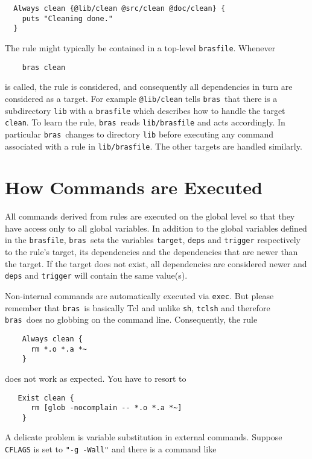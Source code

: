 \documentclass[12pt]{article}
\newcommand{\bras}{\texttt{bras}}
\begin{document}
\begin{verbatim}
  Always clean {@lib/clean @src/clean @doc/clean} {
    puts "Cleaning done."
  }
\end{verbatim}

The rule might typically be contained in a top-level
\texttt{brasfile}. Whenever 
\begin{verbatim}
    bras clean
\end{verbatim}
is called, the rule is considered, and consequently all
dependencies in turn are considered as a target. For example
\texttt{@lib/clean} tells \bras\ that there is a subdirectory
\texttt{lib} with a \texttt{brasfile} which
describes how to handle the target \texttt{clean}. To learn
the rule, \bras\ reads \texttt{lib/brasfile} and acts accordingly.
In particular \bras\ changes to directory \texttt{lib}
before executing any command associated with a rule in
\texttt{lib/brasfile}. The other targets are handled similarly.


\section{How Commands are Executed}
\label{secCmdExec}

All commands derived from rules are executed on the global level
so that they have access only to all global variables. In addition
to the global variables defined in the
\texttt{brasfile}, \bras\ sets the variables \texttt{target},
\texttt{deps} and \texttt{trigger} respectively to the rule's target, its
dependencies and the dependencies that are newer than the target. If
the target does not exist, all dependencies are considered newer and
\texttt{deps} and \texttt{trigger} will contain the same value(s).

Non-internal commands are automatically executed
via \texttt{exec}. But please remember that \bras\ is basically
Tcl and unlike \texttt{sh}, \texttt{tclsh} and therefore \bras\ does no
globbing on the command line. Consequently, the rule
\begin{verbatim}
    Always clean {
      rm *.o *.a *~
    }
\end{verbatim}
does not work as expected. You have to resort to
\begin{verbatim}
   Exist clean {
      rm [glob -nocomplain -- *.o *.a *~]
    }
\end{verbatim}
    
A delicate problem is variable substitution in
external commands. Suppose \texttt{CFLAGS} is set to 
\texttt{"-g -Wall"} and there is a command like 
\end{document}
